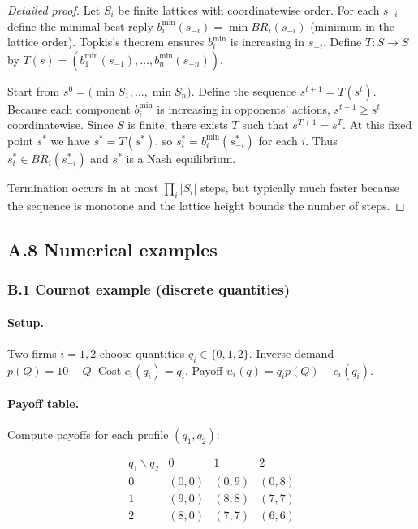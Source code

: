 \documentclass[11pt]{article}
\begin{document}
\begin{proof}[Detailed proof]
Let \(S_i\) be finite lattices with coordinatewise order. For each
\(s_{-i}\) define the minimal best reply
\(b_i^{\min}(s_{-i})=\min BR_i(s_{-i})\) (minimum in the lattice order).
Topkis's theorem ensures \(b_i^{\min}\) is increasing in \(s_{-i}\). Define
\(T:S\to S\) by \(T(s)=(b_1^{\min}(s_{-1}),\dots,b_n^{\min}(s_{-n}))\).

Start from \(s^0=\big(\min S_1,\dots,\min S_n\big)\). Define the sequence
\(s^{t+1}=T(s^t)\). Because each component \(b_i^{\min}\) is increasing in
opponents' actions, \(s^{t+1}\ge s^t\) coordinatewise. Since \(S\) is finite,
there exists \(T\) such that \(s^{T+1}=s^T\). At this fixed point \(s^\ast\)
we have \(s^\ast=T(s^\ast)\), so \(s_i^\ast=b_i^{\min}(s^\ast_{-i})\) for
each \(i\). Thus \(s_i^\ast\in BR_i(s^\ast_{-i})\) and \(s^\ast\) is a Nash
equilibrium.

Termination occurs in at most \(\prod_i |S_i|\) steps, but typically much
faster because the sequence is monotone and the lattice height bounds the
number of steps.
\end{proof}

\subsection{A.8 Numerical examples}


\subsubsection{B.1 Cournot example (discrete quantities)}

\paragraph{Setup.} Two firms \(i=1,2\) choose quantities \(q_i\in\{0,1,2\}\).
Inverse demand \(p(Q)=10-Q\). Cost \(c_i(q_i)=q_i\). Payoff
\(u_i(q)=q_i p(Q)-c_i(q_i)\).

\paragraph{Payoff table.} Compute payoffs for each profile \((q_1,q_2)\):


\[
\begin{array}{c|ccc}
q_1\backslash q_2 & 0 & 1 & 2\\\hline
0 & (0,0) & (0,9) & (0,8)\\
1 & (9,0) & (8,8) & (7,7)\\
2 & (8,0) & (7,7) & (6,6)
\end{array}
\]
\end{document}

